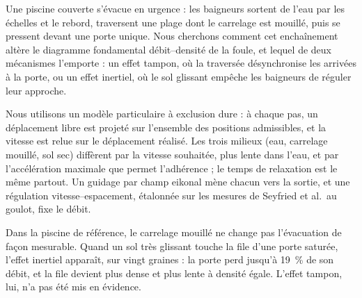 
Une piscine couverte s'évacue en urgence : les baigneurs sortent de l'eau par les échelles et
le rebord, traversent une plage dont le carrelage est mouillé, puis se pressent devant une
porte unique. Nous cherchons comment cet enchaînement altère le diagramme fondamental
débit--densité de la foule, et lequel de deux mécanismes l'emporte : un effet tampon, où la
traversée désynchronise les arrivées à la porte, ou un effet inertiel, où le sol glissant
empêche les baigneurs de réguler leur approche.

Nous utilisons un modèle particulaire à exclusion dure : à chaque pas, un déplacement libre
est projeté sur l'ensemble des positions admissibles, et la vitesse est relue sur le
déplacement réalisé. Les trois milieux (eau, carrelage mouillé, sol sec) diffèrent par la
vitesse souhaitée, plus lente dans l'eau, et par l'accélération maximale que permet
l'adhérence ; le temps de relaxation est le même partout.
Un guidage par champ eikonal mène chacun vers la sortie, et une régulation vitesse--espacement,
étalonnée sur les mesures de Seyfried et al.\ au goulot, fixe le débit.

Dans la piscine de référence, le carrelage mouillé ne change pas l'évacuation de façon
mesurable. Quand un sol très glissant touche la file d'une porte saturée, l'effet inertiel
apparaît, sur vingt graines : la porte perd jusqu'à \SI{19}{\percent} de son débit, et la file
devient plus dense et plus lente à densité égale. L'effet tampon, lui, n'a pas été mis en
évidence.
